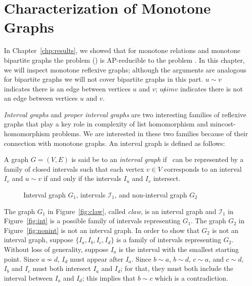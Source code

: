 \chapter{Characterization of Monotone Graphs}
In Chapter~\ref{chp:results}, we showed that for monotone relations and monotone
bipartite graphs the problem \ccsp(\mH) is AP-reducible to the problem \cbis\@. In this chapter,
we will inspect monotone reflexive graphs; although the arguments are
analogous for bipartite graphs we will not cover bipartite graphs in this part.
\(u \sim v\) indicates there is an edge between vertices \(u\) and \(v\);
\(u \not sim v\) indicates there is not an edge between vertices \(u\) and \(v\)\@.

\emph{Interval graphs} and \emph{proper interval graphs}
are two interesting families of reflexive graphs that play a key role in complexity of 
list homomorphism and mincost-homomorphism problems. We are interested in these two families
because of their connection with monotone graphs. 
An interval graph is defined as follows:

\begin{defi}
A graph \(G=(V,E)\) is said be to an \emph{interval graph} if \mG\ can
be represented by a family of closed intervals such that
each vertex \(v \in V\) corresponds to an interval \(I_v\) and \(u \sim v\)
if and only if the intervals \(I_u\) and \(I_v\) intersect.
\end{defi}

\begin{figure} [h]
\center
\subfigure[\ensuremath{G_1}]{\label{fig:claw}} \hspace{2cm}
\subfigure[\ensuremath{I_1}]{\label{fig:int}} \hspace{2cm}
\subfigure[\ensuremath{G_2}]{\label{fig:nonint}}
\caption{Interval graph \ensuremath{G_1}, intervals \ensuremath{\mathcal{I}_1}, and non-interval graph \ensuremath{G_2}}
\end{figure}

The graph \(G_1\) in Figure~\ref{fig:claw}, called \emph{claw}, is an interval graph
and \(\mathcal{I}_1\) in Figure~\ref{fig:int} is a possible family of intervals representing \(G_1\)\@.
The graph \(G_2\) in Figure~\ref{fig:nonint} is not an interval graph. In order to show that \(G_2\) is not
an interval graph, suppose \(\{I_a, I_b, I_c, I_d\}\) is a family of intervals representing \(G_2\)\@.
Without loss of generality, suppose \(I_a\) is the interval with the smallest starting point.
Since \(a\not \sim d\), \(I_d\) must appear after \(I_a\)\@. Since \(b\sim a\), \(b\sim d\), \(c\sim a\), and \(c\sim d\),
\(I_b\) and \(I_c\) must both intersect \(I_a\) and \(I_d\); for that, they must both include the interval between
\(I_a\) and \(I_d\); this implies that \(b\sim c\) which is a contradiction.

